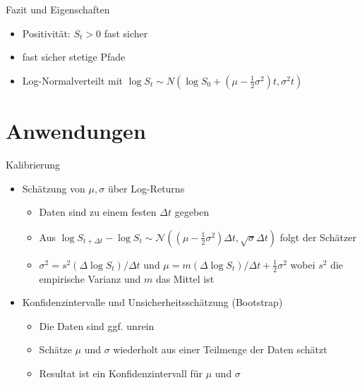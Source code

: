 \documentclass{beamer}
\begin{document}
\begin{frame}{Fazit und Eigenschaften}
  \begin{itemize}
      \item Positivität: $S_t>0$ fast sicher
      \item fast sicher stetige Pfade
      \item Log-Normalverteilt mit $\log S_t \sim N(\log S_0 + (\mu - \tfrac12 \sigma^2)t, \sigma^2 t)$
  \end{itemize}
\end{frame}

\section{Anwendungen}

\begin{frame}{Kalibrierung}
  \begin{itemize}
      \item Schätzung von $\mu,\sigma$ über Log-Returns
      \begin{itemize}
        \item Daten sind zu einem festen $\Delta t$ gegeben
        \item Aus $\log S_{t + \Delta t} - \log S_t \sim \mathcal N((\mu - \tfrac12 \sigma^2)\Delta t, \sqrt{\sigma} \Delta t)$ folgt der Schätzer
        \item $\sigma^2 = s^2(\Delta \log S_t) / \Delta t$ und $\mu = m(\Delta \log S_t) / \Delta t + \tfrac12 \sigma^2$ wobei $s^2$ die empirische Varianz und $m$ das Mittel ist
      \end{itemize}
      \pause
      \item Konfidenzintervalle und Unsicherheitsschätzung (Bootstrap)
      \begin{itemize}
        \item Die Daten sind ggf. unrein
        \item Schätze $\mu$ und $\sigma$ wiederholt aus einer Teilmenge der Daten schätzt
        \item Resultat ist ein Konfidenzintervall für $\mu$ und $\sigma$
      \end{itemize}
  \end{itemize}
\end{frame}
\end{document}
